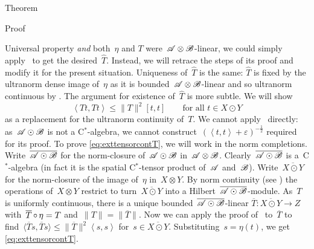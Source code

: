 \documentclass[b]{subfiles}
\begin{document}
\begin{parsec}
\begin{point}{Theorem}
\begin{point}{Proof}
\begin{point}{Universal property}
    \emph{and} both~$\eta$ and $T$ were~$\mathscr{A} \otimes \mathscr{B}$-linear,
    we could simply apply~
    to get the desired~$\hat{T}$.
Instead, we will retrace the steps of its proof
    and modify it for the present situation.
Uniqueness of~$\hat{T}$ is the same:
    $\hat{T}$ is fixed by the ultranorm dense image of~$\eta$
    as it is bounded~$\mathscr{A}\otimes\mathscr{B}$-linear
    and so ultranorm continuous by .
The argument for existence of~$\hat{T}$ is more subtle.
We will show
\begin{equation}\label{eq:exttensorcontT}
    \left<T t, T t\right> \leq \|T\|^2 [t,t]
        \qquad \text{for all~$t \in X \odot Y$}
\end{equation}
as a replacement for the ultranorm continuity of~$T$.
We cannot apply~ directly:
    as~$\mathscr{A} \odot \mathscr{B}$ is not a C$^*$-algebra,
    we cannot construct~$(\left<t,t\right>+\varepsilon)^{-\frac{1}{2}}$
    required for its proof.
To prove \eqref{eq:exttensorcontT}, we will work in the norm completions.
Write~$\overline{\mathscr{A} \odot \mathscr{B}}$
    for the norm-closure of~$\mathscr{A} \odot \mathscr{B}$ in~$\mathscr{A} \otimes \mathscr{B}$.
Clearly~$\overline{\mathscr{A} \odot \mathscr{B}}$
    is a~C$^*$-algebra
    (in fact it is the spatial C$^*$-tensor product of~$\mathscr{A}$ and~$\mathscr{B}$).
Write~$\overline{X \odot Y}$
    for the norm-closure of the image of~$\eta$ in~$X \otimes Y$.
By norm continuity
    (see )
    the operations of~$X \otimes Y$
    restrict to turn~$\overline{X \odot Y}$ into a
    Hilbert~$\overline{\mathscr{A} \odot \mathscr{B}}$-module.
As~$T$ is uniformly continuous,
    there is a unique bounded~$\overline{\mathscr{A}\odot\mathscr{B}}$-linear
    $\overline{T}\colon \overline{X\odot Y} \to Z$
    with~$\overline{T} \mathop{\circ} \eta = T$ and~$\|T\| = \|\overline{T}\|$.
Now we can apply the proof of~
    to~$\overline{T}$
    to find~$\langle \overline{T}s,\overline{T}s\rangle \leq
    \|\overline{T}\|^2\left<s,s\right>$
    for~$s \in \overline{X \odot Y}$.
Substituting~$s = \eta(t)$,
    we get \eqref{eq:exttensorcontT}.


\end{point}
\end{point}
\end{point}
\end{parsec}
\end{document}
